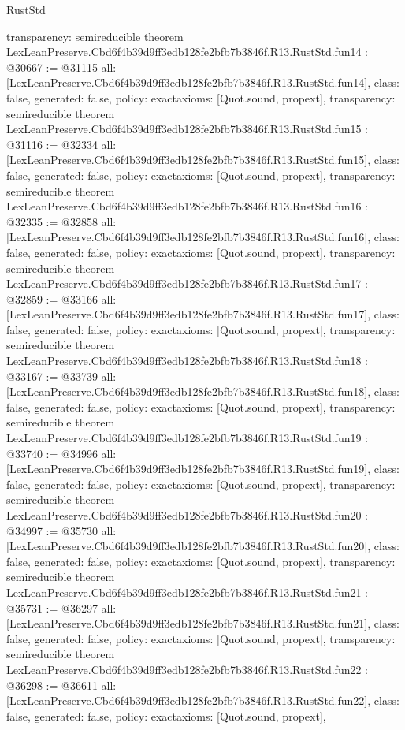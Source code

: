 \begin{lexlean}{RustStd}
\begin{coremodule}
{  transparency: semireducible
}
theorem LexLeanPreserve.Cbd6f4b39d9ff3edb128fe2bfb7b3846f.R13.RustStd.fun14 : @30667 := @31115 {
  all: [LexLeanPreserve.Cbd6f4b39d9ff3edb128fe2bfb7b3846f.R13.RustStd.fun14],
  class: false,
  generated: false,
  policy: exact{axioms: [Quot.sound, propext]},
  transparency: semireducible
}
theorem LexLeanPreserve.Cbd6f4b39d9ff3edb128fe2bfb7b3846f.R13.RustStd.fun15 : @31116 := @32334 {
  all: [LexLeanPreserve.Cbd6f4b39d9ff3edb128fe2bfb7b3846f.R13.RustStd.fun15],
  class: false,
  generated: false,
  policy: exact{axioms: [Quot.sound, propext]},
  transparency: semireducible
}
theorem LexLeanPreserve.Cbd6f4b39d9ff3edb128fe2bfb7b3846f.R13.RustStd.fun16 : @32335 := @32858 {
  all: [LexLeanPreserve.Cbd6f4b39d9ff3edb128fe2bfb7b3846f.R13.RustStd.fun16],
  class: false,
  generated: false,
  policy: exact{axioms: [Quot.sound, propext]},
  transparency: semireducible
}
theorem LexLeanPreserve.Cbd6f4b39d9ff3edb128fe2bfb7b3846f.R13.RustStd.fun17 : @32859 := @33166 {
  all: [LexLeanPreserve.Cbd6f4b39d9ff3edb128fe2bfb7b3846f.R13.RustStd.fun17],
  class: false,
  generated: false,
  policy: exact{axioms: [Quot.sound, propext]},
  transparency: semireducible
}
theorem LexLeanPreserve.Cbd6f4b39d9ff3edb128fe2bfb7b3846f.R13.RustStd.fun18 : @33167 := @33739 {
  all: [LexLeanPreserve.Cbd6f4b39d9ff3edb128fe2bfb7b3846f.R13.RustStd.fun18],
  class: false,
  generated: false,
  policy: exact{axioms: [Quot.sound, propext]},
  transparency: semireducible
}
theorem LexLeanPreserve.Cbd6f4b39d9ff3edb128fe2bfb7b3846f.R13.RustStd.fun19 : @33740 := @34996 {
  all: [LexLeanPreserve.Cbd6f4b39d9ff3edb128fe2bfb7b3846f.R13.RustStd.fun19],
  class: false,
  generated: false,
  policy: exact{axioms: [Quot.sound, propext]},
  transparency: semireducible
}
theorem LexLeanPreserve.Cbd6f4b39d9ff3edb128fe2bfb7b3846f.R13.RustStd.fun20 : @34997 := @35730 {
  all: [LexLeanPreserve.Cbd6f4b39d9ff3edb128fe2bfb7b3846f.R13.RustStd.fun20],
  class: false,
  generated: false,
  policy: exact{axioms: [Quot.sound, propext]},
  transparency: semireducible
}
theorem LexLeanPreserve.Cbd6f4b39d9ff3edb128fe2bfb7b3846f.R13.RustStd.fun21 : @35731 := @36297 {
  all: [LexLeanPreserve.Cbd6f4b39d9ff3edb128fe2bfb7b3846f.R13.RustStd.fun21],
  class: false,
  generated: false,
  policy: exact{axioms: [Quot.sound, propext]},
  transparency: semireducible
}
theorem LexLeanPreserve.Cbd6f4b39d9ff3edb128fe2bfb7b3846f.R13.RustStd.fun22 : @36298 := @36611 {
  all: [LexLeanPreserve.Cbd6f4b39d9ff3edb128fe2bfb7b3846f.R13.RustStd.fun22],
  class: false,
  generated: false,
  policy: exact{axioms: [Quot.sound, propext]},
}
\end{coremodule}
\end{lexlean}
